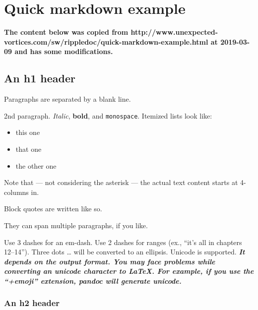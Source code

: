 \documentclass[
  12pt,
  a4paper,
  oneside,tablecaptionabove
]{scrbook}
\newcommand{\passthrough}[1]{#1}
\providecommand{\tightlist}{%
  \setlength{\itemsep}{0pt}\setlength{\parskip}{0pt}}
\renewenvironment{quote}{\begin{customblockquote}\list{}{\rightmargin=0em\leftmargin=0em}%
\item\relax\color{blockquote-text}\ignorespaces}{\unskip\unskip\endlist\end{customblockquote}}
\def \logbuchsubjectmark {}
\def \logbuchsubjectdatemark {}
\def \logbuchsubjectauthmark {}
\begin{document}
\chapter*{\LARGE{Quick markdown example}}

\setcounter{section}{0}

\def \logbuchsubjectmark {Quick markdown example}
\def \logbuchsubjectdatemark {09.03.2019 02:40}
\def \logbuchsubjectauthmark {\textit{bertolino}}
\thispagestyle{eisvogel-header-footer}
\textbf{The content below was copied from
http://www.unexpected-vortices.com/sw/rippledoc/quick-markdown-example.html
at 2019-03-09 and has some modifications.}

\hypertarget{an-h1-header}{%
\section{An h1 header}\label{an-h1-header}}

Paragraphs are separated by a blank line.

2nd paragraph. \emph{Italic}, \textbf{bold}, and
\passthrough{\lstinline!monospace!}. Itemized lists look like:

\begin{itemize}
\tightlist
\item
  this one
\item
  that one
\item
  the other one
\end{itemize}

Note that --- not considering the asterisk --- the actual text content
starts at 4-columns in.

\begin{quote}
Block quotes are written like so.

They can span multiple paragraphs, if you like.
\end{quote}

Use 3 dashes for an em-dash. Use 2 dashes for ranges (ex., ``it's all in
chapters 12--14''). Three dots \ldots{} will be converted to an
ellipsis. Unicode is supported. \textbf{\emph{It depends on the output
format. You may face problems while converting an unicode character to
LaTeX. For example, if you use the ``+emoji'' extension, pandoc will
generate unicode.}}

\hypertarget{an-h2-header}{%
\subsection{An h2 header}\label{an-h2-header}}
\end{document}
